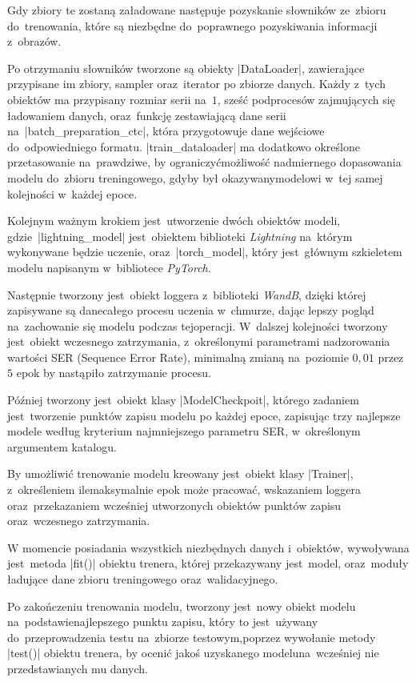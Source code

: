 Gdy zbiory te zostaną załadowane następuje pozyskanie słowników ze~zbioru do~trenowania, które są niezbędne do~poprawnego pozyskiwania informacji z~obrazów.

Po otrzymaniu słowników tworzone są obiekty \pyth|DataLoader|, zawierające przypisane im zbiory, sampler oraz~iterator po zbiorze danych. Każdy z~tych obiektów ma przypisany rozmiar serii na~$1$, sześć podprocesów zajmujących się ładowaniem  danych, oraz~funkcję zestawiającą dane serii \linebreak na~\pyth|batch_preparation_ctc|, która przygotowuje dane wejściowe do~odpowiedniego formatu. \pyth|train_dataloader| ma dodatkowo określone przetasowanie na~prawdziwe, by ograniczyć\linebreak możliwość nadmiernego dopasowania modelu do~zbioru treningowego, gdyby był okazywany\linebreak modelowi w~tej samej kolejności w~każdej epoce.

Kolejnym ważnym krokiem jest~utworzenie dwóch obiektów modeli, gdzie~\pyth|lightning_model| jest~obiektem biblioteki \textit{Lightning} na~którym wykonywane będzie uczenie, oraz~\pyth|torch_model|, który jest~głównym szkieletem modelu napisanym w~bibliotece \textit{PyTorch}.

Następnie tworzony jest~obiekt loggera z~biblioteki \textit{WandB}, dzięki której zapisywane są dane\linebreak całego procesu uczenia w~chmurze, dając lepszy pogląd na~zachowanie się modelu podczas tej\linebreak operacji. W~dalszej kolejności tworzony jest~obiekt wczesnego zatrzymania, z~określonymi parametrami nadzorowania wartości SER (Sequence Error Rate), minimalną zmianą na~poziomie $0,01$ przez $5$ epok by nastąpiło zatrzymanie procesu.

Później tworzony jest~obiekt klasy \pyth|ModelCheckpoit|, którego zadaniem jest~tworzenie punktów zapisu modelu po każdej epoce, zapisując trzy najlepsze modele według kryterium najmniejszego parametru SER, w~określonym argumentem katalogu.

By umożliwić trenowanie modelu kreowany jest~obiekt klasy \pyth|Trainer|, z~określeniem ile\linebreak maksymalnie epok może pracować, wskazaniem loggera oraz~przekazaniem wcześniej utworzonych obiektów punktów zapisu oraz~wczesnego zatrzymania.

W momencie posiadania wszystkich niezbędnych danych i~obiektów, wywoływana jest~metoda \pyth|fit()| obiektu trenera, której przekazywany jest~model, oraz~moduły ładujące dane zbioru treningowego oraz~walidacyjnego.

Po zakończeniu trenowania modelu, tworzony jest~nowy obiekt modelu na~podstawie\linebreak najlepszego punktu zapisu, który to jest~używany do~przeprowadzenia testu na~zbiorze testowym,\linebreak poprzez wywołanie metody \pyth|test()| obiektu trenera, by ocenić jakoś uzyskanego modelu\linebreak na~wcześniej nie przedstawianych mu danych.